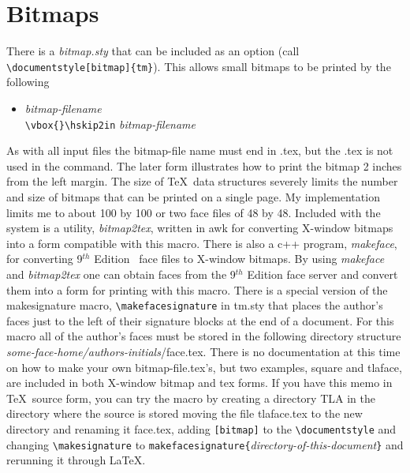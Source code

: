 \section{Bitmaps\label{sec:bitmaps}}
There is a {\it bitmap.sty} that can be included as an option (call 
\verb|\documentstyle[bitmap]{tm}|).  This allows small bitmaps to be
printed by the following
\begin{itemize}
\item[]
\verb|| {\it bitmap-filename}\\
\verb|\vbox{}\hskip2in| {\it bitmap-filename}
\end{itemize}
As with all input files the bitmap-file name must end in .tex, but the
.tex is not used in the command.  The later form illustrates how to
print the bitmap 2 inches from the left margin.  The size of \TeX\
data structures severely limits the number and size of bitmaps that
can be printed on a single page.  My implementation limits me to about
100 by 100 or two face files of 48 by 48.  Included with the system is
a utility, {\it bitmap2tex}, written in awk for converting X-window
bitmaps into a form compatible with this macro.  There is also a c++
program, {\it makeface}, for converting 9$^{th}$ Edition \UNIX\ face
files to X-window bitmaps.  By using {\it makeface} and {\it
bitmap2tex} one can obtain faces from the 9$^{th}$ Edition face server
and convert them into a form for printing with this macro.  There is a
special version of the makesignature macro, \verb|\makefacesignature|
in tm.sty that places the author's faces just to the left of their
signature blocks at the end of a document.  For this macro all of the
author's faces must be stored in the following directory structure
{\it some-face-home/authors-initials}/face.tex.  There is no
documentation at this time on how to make your own bitmap-file.tex's,
but two examples, square and tlaface, are included in both X-window
bitmap and tex forms.  If you have this memo in \TeX\ source form, you
can try the macro by creating a directory TLA in the directory where
the source is stored moving the file tlaface.tex to the new directory
and renaming it face.tex, adding \verb|[bitmap]| to the
\verb|\documentstyle| and changing \verb|\makesignature| to
\verb|makefacesignature{|{\it directory-of-this-document}\verb|}| and
rerunning it through \LaTeX .

